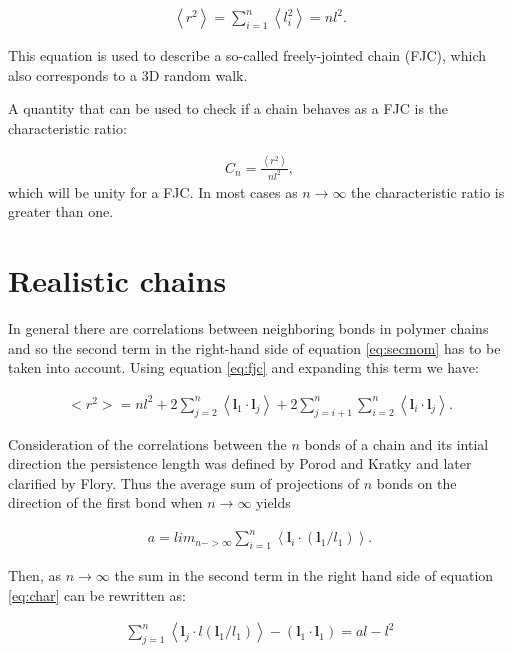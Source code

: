 \begin{gather}
\label{eq:fjc}  
\left<r^2 \right> = \sum_{i=1}^{n}\left<l_{i}^2\right> = nl^2 .
\end{gather}  

This equation is used to describe a so-called freely-jointed chain
(FJC), which also corresponds to a 3D random walk.

A quantity that can be used to check if a chain behaves as a FJC is the
characteristic ratio:

\begin{gather}
C_{n}=\frac{\left<r^{2}\right>}{nl^{2}} ,
\end{gather}
which will be unity for a FJC. In most cases as $n \to \infty$ the
characteristic ratio is greater than one.

\section{Realistic chains}
In general there are  correlations between neighboring bonds in polymer
chains  and so  the second  term in  the right-hand  side  of equation
\ref{eq:secmom}  has  to  be   taken  into  account.   Using  equation
\ref{eq:fjc} and expanding this term we have:

\begin{gather}
\label{eq:char}  
<r^{2}> = nl^{2} + 2 \sum_{j=2}^{n}
\left<  \mathbf{l}_{1} \cdot \mathbf{l}_{j}\right> +
2 \sum_{j=i+1}^{n}\sum_{i=2}^{n}
\left< \mathbf{l}_{i} \cdot \mathbf{l}_{j}\right> .
\end{gather}

Consideration of the correlations between the $n$ bonds of a chain and
its intial  direction the persistence  length was defined by  Porod and
Kratky  and  later  clarified  by  Flory.  Thus  the  average  sum  of
projections of  $n$ bonds on the  direction of the first  bond when $n
\to \infty$ yields

\begin{gather}
a    =   lim_{n->\infty}\sum_{i=1}^{n}    \left<\mathbf{l}_{i}   \cdot
(\mathbf{l}_{1}/l_{1}) \right> .
\end{gather}
  
Then, as $n \to \infty$ the sum in the second term in the right hand
side of equation \ref{eq:char} can be rewritten as:

\begin{gather}
\sum_{j=1}^{n}   \left<\mathbf{l}_{j}   \cdot  l(\mathbf{l}_{1}/l_{1})
\right> -(\mathbf{l}_{1} \cdot \mathbf{l}_{1}) = al - l^{2}
\end{gather}  

